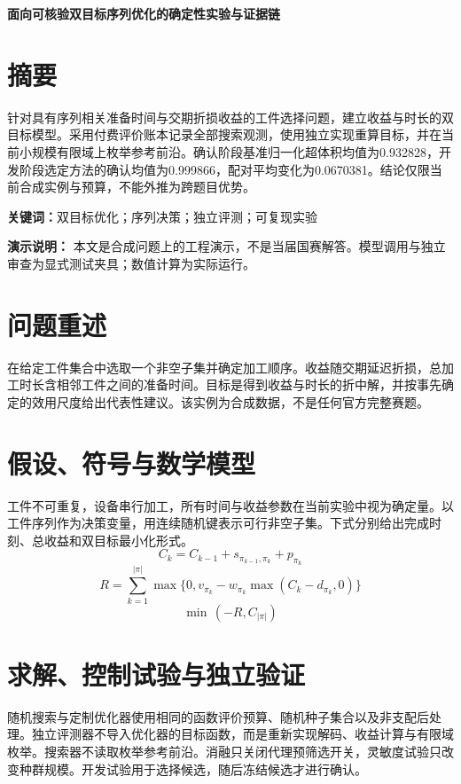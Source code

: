 \documentclass[UTF8,fontset=fandol,a4paper,zihao=-4]{ctexart}
\begin{document}
\begin{center}{\LARGE\bfseries 面向可核验双目标序列优化的确定性实验与证据链}\end{center}
\section*{摘要}
针对具有序列相关准备时间与交期折损收益的工件选择问题，建立收益与时长的双目标模型。采用付费评价账本记录全部搜索观测，使用独立实现重算目标，并在当前小规模有限域上枚举参考前沿。确认阶段基准归一化超体积均值为0.932828，开发阶段选定方法的确认均值为0.999866，配对平均变化为0.0670381。结论仅限当前合成实例与预算，不能外推为跨题目优势。
\par\noindent\textbf{关键词：}双目标优化；序列决策；独立评测；可复现实验
\par\medskip\noindent\textbf{演示说明：} 本文是合成问题上的工程演示，不是当届国赛解答。模型调用与独立审查为显式测试夹具；数值计算为实际运行。
\label{abstract-end}\clearpage
\section{问题重述}
在给定工件集合中选取一个非空子集并确定加工顺序。收益随交期延迟折损，总加工时长含相邻工件之间的准备时间。目标是得到收益与时长的折中解，并按事先确定的效用尺度给出代表性建议。该实例为合成数据，不是任何官方完整赛题。
\section{假设、符号与数学模型}
工件不可重复，设备串行加工，所有时间与收益参数在当前实验中视为确定量。以工件序列作为决策变量，用连续随机键表示可行非空子集。下式分别给出完成时刻、总收益和双目标最小化形式。
\begin{equation}
C_k=C_{k-1}+s_{\pi_{k-1},\pi_k}+p_{\pi_k}
\end{equation}
\begin{equation}
R=\sum_{k=1}^{|\pi|}\max\{0,v_{\pi_k}-w_{\pi_k}\max(C_k-d_{\pi_k},0)\}
\end{equation}
\begin{equation}
\min\,(-R,C_{|\pi|})
\end{equation}
\section{求解、控制试验与独立验证}
随机搜索与定制优化器使用相同的函数评价预算、随机种子集合以及非支配后处理。独立评测器不导入优化器的目标函数，而是重新实现解码、收益计算与有限域枚举。搜索器不读取枚举参考前沿。消融只关闭代理预筛选开关，灵敏度试验只改变种群规模。开发试验用于选择候选，随后冻结候选才进行确认。
\end{document}
